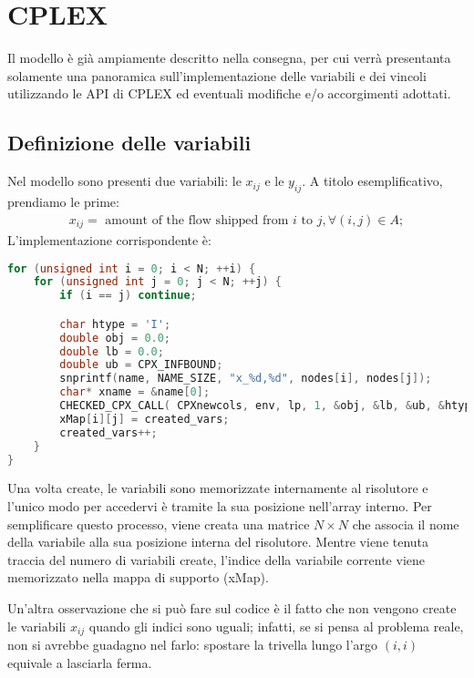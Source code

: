
\section{CPLEX}\label{sec:cplex}
Il modello è già ampiamente descritto nella consegna, per cui verrà presentanta solamente una panoramica
sull'implementazione delle variabili e dei vincoli utilizzando le API di CPLEX
ed eventuali modifiche e/o accorgimenti adottati.

\subsection{Definizione delle variabili}
Nel modello sono presenti due variabili: le $x_{ij}$ e le $y_{ij}$.
A titolo esemplificativo, prendiamo le prime:
%
\begin{gather*}
x_{ij} = \text{ amount of the flow shipped from } i \text{ to } j, ∀ (i,j) \in A;
\end{gather*}
%
L'implementazione corrispondente è:
%
\label{lst:cplex-variabili}
\begin{lstlisting}[language=C++, caption=Creazione delle variabili $x_{ij}$]
for (unsigned int i = 0; i < N; ++i) {
	for (unsigned int j = 0; j < N; ++j) {
		if (i == j) continue;

		char htype = 'I';
		double obj = 0.0;
		double lb = 0.0;
		double ub = CPX_INFBOUND;
		snprintf(name, NAME_SIZE, "x_%d,%d", nodes[i], nodes[j]);
		char* xname = &name[0];
		CHECKED_CPX_CALL( CPXnewcols, env, lp, 1, &obj, &lb, &ub, &htype, &xname );
		xMap[i][j] = created_vars;
		created_vars++;
	}
}
\end{lstlisting}
%
Una volta create, le variabili sono memorizzate internamente al risolutore e l'unico modo per accedervi è tramite la sua posizione nell'array interno.
Per semplificare questo processo, viene creata una matrice $N\times N$ che associa il nome della variabile alla sua posizione interna del risolutore.
Mentre viene tenuta traccia del numero di variabili create, l'indice della variabile corrente viene memorizzato nella mappa di supporto (\textsf{xMap}).

Un'altra osservazione che si può fare sul codice è il fatto che non vengono create le variabili $x_{ij}$ quando gli indici sono uguali;
infatti, se si pensa al problema reale, non si avrebbe guadagno nel farlo: spostare la trivella lungo l'argo $(i, i)$ equivale a lasciarla ferma.
